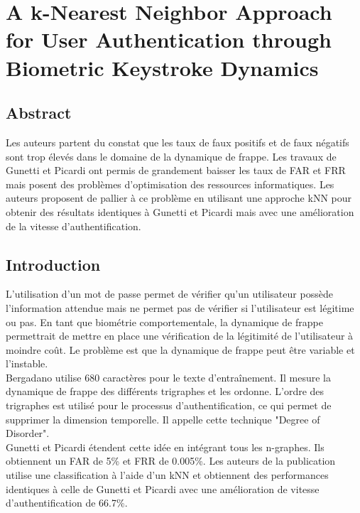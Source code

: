 \section{A k-Nearest Neighbor Approach for User Authentication through Biometric Keystroke Dynamics\cite{Hu2008}}

\subsection{Abstract}

Les auteurs partent du constat que les taux de faux positifs et de faux négatifs sont trop élevés dans le domaine de la dynamique de frappe. Les travaux de Gunetti et Picardi ont permis de grandement baisser les taux de FAR et FRR mais posent des problèmes d'optimisation des ressources informatiques. Les auteurs proposent de pallier à ce problème en utilisant une approche kNN pour obtenir des résultats identiques à Gunetti et Picardi mais avec une amélioration de la vitesse d'authentification.\\

\subsection{Introduction}

L'utilisation d'un mot de passe permet de vérifier qu'un utilisateur possède l'information attendue mais ne permet pas de vérifier si l'utilisateur est légitime ou pas. En tant que biométrie comportementale, la dynamique de frappe permettrait de mettre en place une vérification de la légitimité de l'utilisateur à moindre coût. Le problème est que la dynamique de frappe peut être variable et l'instable.\\

Bergadano utilise 680 caractères pour le texte d'entraînement. Il mesure la dynamique de frappe des différents trigraphes et les ordonne. L'ordre des trigraphes est utilisé pour le processus d'authentification, ce qui permet de supprimer la dimension temporelle. Il appelle cette technique "Degree of Disorder".\\

Gunetti et Picardi étendent cette idée en intégrant tous les n-graphes. Ils obtiennent un FAR de 5\% et FRR de 0.005\%. Les auteurs de la publication utilise une classification à l'aide d'un kNN et obtiennent des performances identiques à celle de Gunetti et Picardi avec une amélioration de vitesse d'authentification de 66.7\%.

